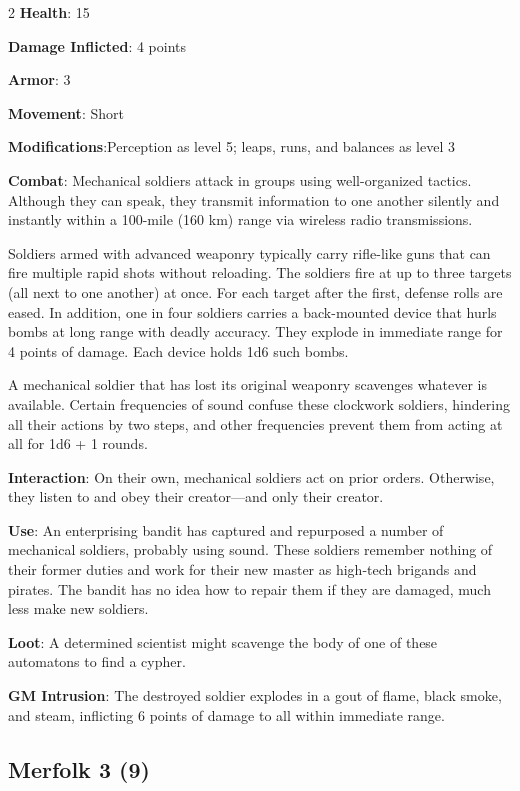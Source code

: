 \begin{multicols}{2}
\textbf{Health}: 15

\textbf{Damage Inflicted}: 4 points

\textbf{Armor}: 3

\textbf{Movement}: Short

\textbf{Modifications}:Perception as level 5; leaps, runs, and balances as level 3

\textbf{Combat}: Mechanical soldiers attack in groups using well-organized tactics. Although they can speak, they transmit information to one another silently and instantly within a 100-mile (160 km) range via wireless radio transmissions.

Soldiers armed with advanced weaponry typically carry rifle-like guns that can fire multiple rapid shots without reloading. The soldiers fire at up to three targets (all next to one another) at once. For each target after the first, defense rolls are eased.
In addition, one in four soldiers carries a back-mounted device that hurls bombs at long range with deadly accuracy. They explode in immediate range for 4 points of damage. Each device holds 1d6 such bombs.

A mechanical soldier that has lost its original weaponry scavenges whatever is available.
Certain frequencies of sound confuse these clockwork soldiers, hindering all their actions by two steps, and other frequencies prevent them from acting at all for 1d6 + 1 rounds.

\textbf{Interaction}: On their own, mechanical soldiers act on prior orders. Otherwise, they listen to and obey their creator—and only their creator.

\textbf{Use}: An enterprising bandit has captured and repurposed a number of mechanical soldiers, probably using sound. These soldiers remember nothing of their former duties and work for their new master as high-tech brigands and pirates. The bandit has no idea how to repair them if they are damaged, much less make new soldiers.

\textbf{Loot}: A determined scientist might scavenge the body of one of these automatons to find a cypher.

\textbf{GM Intrusion}: The destroyed soldier explodes in a gout of flame, black smoke, and steam, inflicting 6 points of damage to all within immediate range.

\subsection{Merfolk 3 (9)}


\end{multicols}

